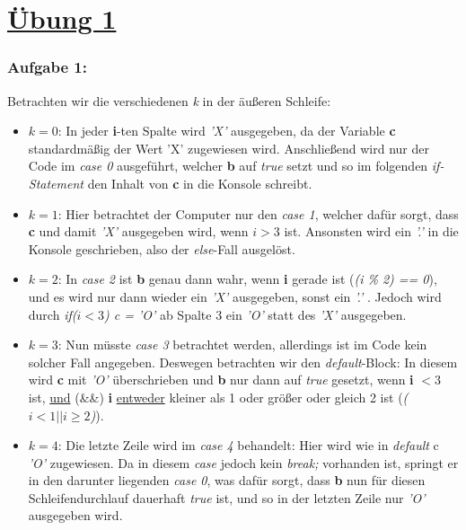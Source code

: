 \documentclass{article}
\begin{document}
\section*{\underline{Übung 1}}
    \subsubsection*{Aufgabe 1:}

    Betrachten wir die verschiedenen \emph{k} in der äußeren Schleife:
    \begin{itemize}
        \item $k = 0$: \newline
        In jeder \textbf{i}-ten Spalte wird \emph{'X'} ausgegeben, da der Variable \textbf{c} standardmäßig der Wert 'X' zugewiesen wird.
        Anschließend wird nur der Code im \emph{case 0} ausgeführt, welcher \textbf{b} auf \textit{true} setzt und so im folgenden \emph{if-Statement} den Inhalt von \textbf{c} in die Konsole schreibt.
        \item $k = 1$: \newline
        Hier betrachtet der Computer nur den \emph{case 1}, welcher dafür sorgt, dass \textbf{c} und damit \emph{'X'} ausgegeben wird, wenn $i > 3$ ist.
        Ansonsten wird ein \emph{'.'} in die Konsole geschrieben, also der \emph{else}-Fall ausgelöst.
        \item $k = 2$: \newline
        In \emph{case 2} ist \textbf{b} genau dann wahr, wenn \textbf{i} gerade ist (\textit{(i \% 2) == 0}), und es wird nur dann wieder ein \emph{'X'} ausgegeben,
        sonst ein \emph{'.'} . Jedoch wird durch \emph{if($i < 3$) c = 'O'} ab Spalte 3 ein \emph{'O'} statt des \emph{'X'} ausgegeben.
        \item $k = 3$: \newline
        Nun müsste \emph{case 3} betrachtet werden, allerdings ist im Code kein solcher Fall angegeben. Deswegen betrachten wir den \emph{default}-Block:
        In diesem wird \textbf{c} mit \emph{'O'} überschrieben und \textbf{b} nur dann auf \emph{true} gesetzt, wenn \textbf{i} $< 3$ ist, \underline{und} (\&\&)
        \textbf{i} \underline{entweder} kleiner als 1 oder größer oder gleich 2 ist (\textit{($i < 1 || i \geq 2$)}).
        \item $k = 4$: \newline
        Die letzte Zeile wird im \emph{case 4} behandelt: Hier wird wie in \emph{default} c \emph{'O'} zugewiesen. Da in diesem \emph{case} jedoch kein \textit{break;} vorhanden
        ist, springt er in den darunter liegenden \emph{case 0}, was dafür sorgt, dass \textbf{b} nun für diesen Schleifendurchlauf dauerhaft \emph{true} ist, und so
        in der letzten Zeile nur \emph{'O'} ausgegeben wird.
    \end{itemize}
\end{document}
